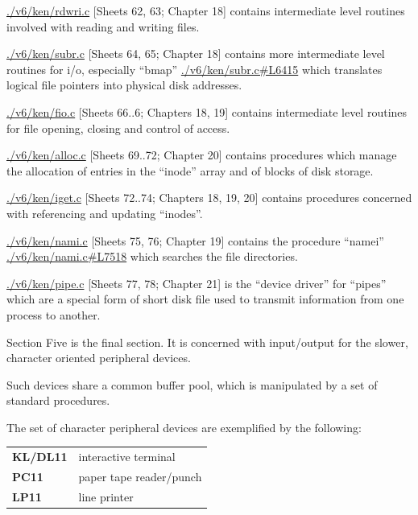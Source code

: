 \item[rdwri.c] \url{./v6/ken/rdwri.c} [Sheets 62, 63; Chapter 18]
contains intermediate level routines
involved with reading and writing
files.
 
 
\item[subr.c] \url{./v6/ken/subr.c} [Sheets 64, 65; Chapter 18]
contains more intermediate level
routines for i/o, especially ``bmap'' \url{./v6/ken/subr.c#L6415}
which translates logical file
pointers into physical disk
addresses.

\item[fio.c] \url{./v6/ken/fio.c} [Sheets 66..6; Chapters 18,
19] contains intermediate level routines 
for file opening, closing and
control of access.

\item[alloc.c] \url{./v6/ken/alloc.c} [Sheets 69..72; Chapter 20]
contains procedures which manage the
allocation of entries in the ``inode''
array and of blocks of disk storage.

\item[iget.c] \url{./v6/ken/iget.c} [Sheets 72..74; Chapters 18,
19, 20] contains procedures concerned 
with referencing and updating
``inodes''.

\item[nami.c] \url{./v6/ken/nami.c} [Sheets 75, 76; Chapter 19]
contains the procedure ``namei'' \url{./v6/ken/nami.c#L7518} which
searches the file directories.


\item[pipe.c] \url{./v6/ken/pipe.c} [Sheets 77, 78; Chapter 21]
is the ``device driver'' for ``pipes''
which are a special form of short
disk file used to transmit information 
from one process to another.
\ed



Section Five is the final section. It
is concerned with input/output for the
slower, character oriented peripheral
devices.

Such devices share a common buffer
pool, which is manipulated by a set of
standard procedures.


The set of character peripheral devices
are exemplified by the following:

\begin{tabular}{ll}\\
{\bf KL/DL11} & interactive terminal\\
{\bf PC11}    & paper tape reader/punch\\
{\bf LP11}    & line printer\\
\end{tabular}


